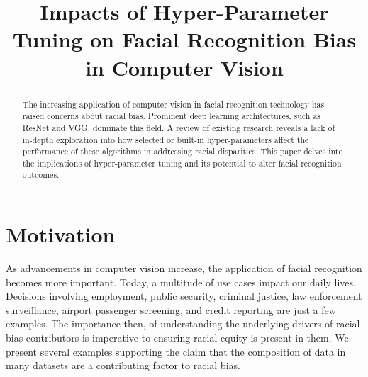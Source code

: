 \documentclass[conference]{IEEEtran}
\begin{document}
\title{Impacts of Hyper-Parameter Tuning on Facial Recognition Bias in Computer Vision\\
}

\author{
\and
{}
\and
{}
\and
{}
}

\maketitle

\begin{abstract}
The increasing application of computer vision in facial recognition technology has raised concerns about racial bias. Prominent deep learning architectures, such as ResNet and VGG, dominate this field. A review of existing research reveals a lack of in-depth exploration into how selected or built-in hyper-parameters affect the performance of these algorithms in addressing racial disparities. This paper delves into the implications of hyper-parameter tuning and its potential to alter facial recognition outcomes.
\end{abstract}

\section{Motivation}
As advancements in computer vision increase, the application of facial recognition becomes more important. Today, a multitude of use cases impact our daily lives. Decisions involving employment, public security, criminal justice, law enforcement surveillance, airport passenger screening, and credit reporting \cite{labati2016biometric,amos2016openface} are just a few examples. The importance then, of understanding the underlying drivers of racial bias contributors is imperative to ensuring racial equity is present in them. We present several examples supporting the claim that the composition of data in many datasets are a contributing factor to racial bias. 
\end{document}
